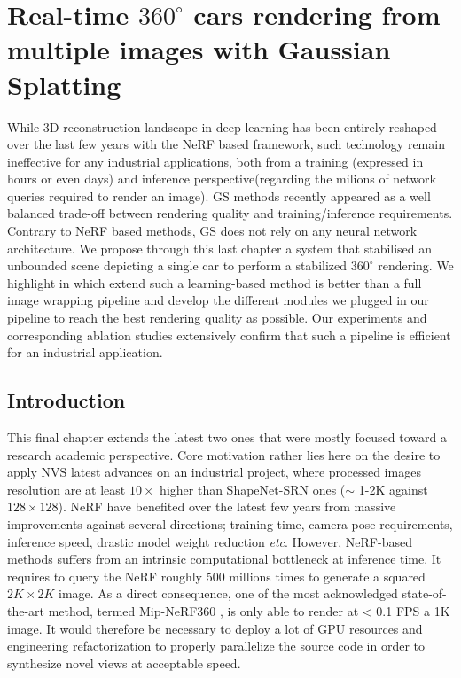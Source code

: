 \chapter{Real-time $360 ^{\circ} $ cars rendering from multiple images with Gaussian Splatting}
\label{chapter:gausssplat}



While 3D reconstruction landscape in deep learning has been entirely reshaped over the last few years with the \ac{NeRF} based framework, such technology remain ineffective for any industrial applications, both from a training (expressed in hours or even days) and inference perspective(regarding the milions of network queries required to render an image). \ac{GS} methods recently appeared as a well balanced trade-off between rendering quality and training/inference requirements. Contrary to \ac{NeRF} based methods, \ac{GS} does not rely on any neural network architecture. We propose through this last chapter a system that stabilised an unbounded scene depicting a single car to perform a stabilized $360 ^{\circ} $ rendering. We highlight in which extend such a learning-based method is better than a full image wrapping pipeline and develop the different modules we plugged in our pipeline to reach the best rendering quality as possible. Our experiments and corresponding ablation studies extensively confirm that such a pipeline is efficient for an industrial application. 

\section{Introduction}
This final chapter extends the latest two ones that were mostly focused toward a research academic perspective. Core motivation rather lies here on the desire to apply \ac{NVS} latest advances on an industrial project, where processed images resolution are at least $10\times$ higher than ShapeNet-SRN \citep{chang2015shapenet,sitzmann2019scene} ones ($\sim$ 1-2K against $128\times128$). \ac{NeRF} have benefited over the latest few years from massive improvements against several directions; training time, camera pose requirements, inference speed, drastic model weight reduction \textit{etc}. 
However, \ac{NeRF}-based methods suffers from an intrinsic computational bottleneck at inference time. It requires to query the \ac{NeRF} roughly 500 millions times to generate a squared $2K\times2K$ image. As a direct consequence, one of the most acknowledged state-of-the-art method, termed Mip-NeRF360 \citep{barron2022mip}, is only able to render at < 0.1 \ac{FPS} a 1K image. It would therefore be necessary to deploy a lot of \ac{GPU} resources and engineering refactorization to properly parallelize the source code in order to synthesize novel views at acceptable speed. 

